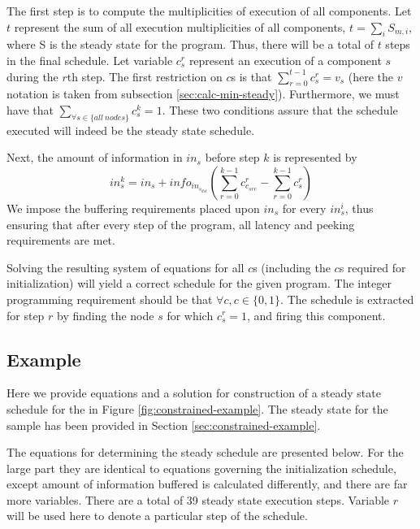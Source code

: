 The first step is to compute the multiplicities of execution of
all components.  Let $t$ represent the sum of all execution
multiplicities of all components, $t = \sum_{i} S_{m,i}$, where S
is the steady state for the program. Thus, there will be a total
of $t$ steps in the final schedule. Let variable $c^r_s$ represent
an execution of a component $s$ during the $r$th step. The first
restriction on $c$s is that $\sum_{r=0}^{t-1} c^r_s = v_s$ (here
the $v$ notation is taken from subsection
\ref{sec:calc-min-steady}). Furthermore, we must have that
$\sum_{\forall s \in \{all\ nodes\}} c^k_s = 1$. These two
conditions assure that the schedule executed will indeed be the
steady state schedule.

Next, the amount of information in {{\Channel}} $in_s$ before step $k$
is represented by $$in^k_s = in_s + info_{in_{s_{dst}}}
\left(\sum_{r=0}^{k-1} c^r_{c_{src}} - \sum_{r=0}^{k-1}
c^r_s\right)$$ We impose the buffering requirements placed upon
$in_s$ for every $in^i_s$, thus ensuring that after every step of
the program, all latency and peeking requirements are met.

Solving the resulting system of equations for all $c$s (including
the $c$s required for initialization) will yield a correct
schedule for the given program.  The integer programming
requirement should be that $\forall c, c \in \{0, 1\}$.  The
schedule is extracted for step $r$ by finding the node $s$ for
which $c^r_s = 1$, and firing this component.

\subsection{Example}
\label{sec:constrained:numbers}

Here we provide equations and a solution for construction of a
steady state schedule for the {\pipeline} in Figure
\ref{fig:constrained-example}. The steady state for the sample
{\pipeline} has been provided in Section
\ref{sec:constrained-example}.

The equations for determining the steady schedule are presented
below.  For the large part they are identical to equations
governing the initialization schedule, except amount of
information buffered is calculated differently, and there are far
more variables.  There are a total of 39 steady state execution
steps.  Variable $r$ will be used here to denote a particular step
of the schedule.

